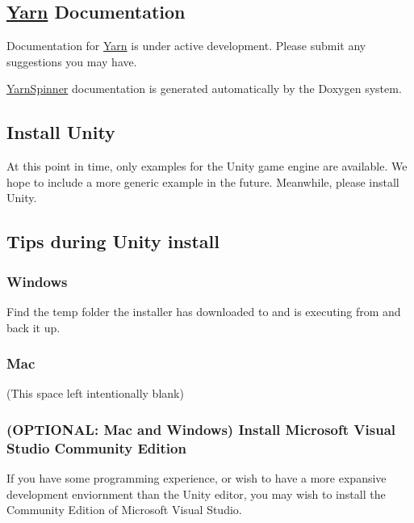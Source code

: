 \subsection*{\hyperlink{a00031}{Yarn} Documentation}

Documentation for \hyperlink{a00031}{Yarn} is under active development. Please submit any suggestions you may have.

\hyperlink{a00313}{Yarn\-Spinner} documentation is generated automatically by the Doxygen system.

\subsection*{Install Unity}

At this point in time, only examples for the Unity game engine are available. We hope to include a more generic example in the future. Meanwhile, please install Unity.

\subsection*{Tips during Unity install}

\subsubsection*{Windows}

Find the temp folder the installer has downloaded to and is executing from and back it up.

\subsubsection*{Mac}

(This space left intentionally blank)

\subsubsection*{(O\-P\-T\-I\-O\-N\-A\-L\-: Mac and Windows) Install Microsoft Visual Studio Community Edition}

If you have some programming experience, or wish to have a more expansive development enviornment than the Unity editor, you may wish to install the Community Edition of Microsoft Visual Studio. 